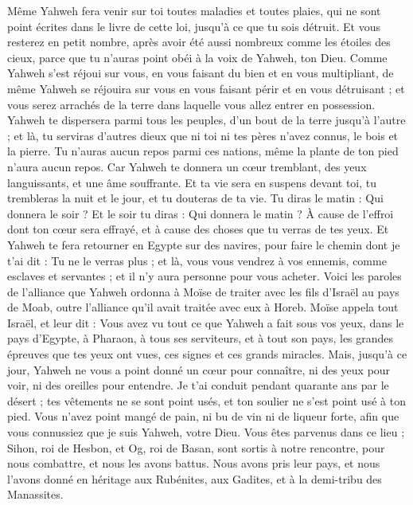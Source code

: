 \begin{multicols}{2}
Même Yahweh fera venir sur toi toutes maladies et toutes plaies, qui ne sont point écrites dans le livre de cette loi, jusqu'à ce que tu sois détruit.
Et vous resterez en petit nombre, après avoir été aussi nombreux comme les étoiles des cieux, parce que tu n'auras point obéi à la voix de Yahweh, ton Dieu.
Comme Yahweh s'est réjoui sur vous, en vous faisant du bien et en vous multipliant, de même Yahweh se réjouira sur vous en vous faisant périr et en vous détruisant ; et vous serez arrachés de la terre dans laquelle vous allez entrer en possession.
Yahweh te dispersera parmi tous les peuples, d’un bout de la terre jusqu'à l'autre ; et là, tu serviras d'autres dieux que ni toi ni tes pères n'avez connus, le bois et la pierre.
Tu n'auras aucun repos parmi ces nations, même la plante de ton pied n'aura aucun repos. Car Yahweh te donnera un cœur tremblant, des yeux languissants, et une âme souffrante.
Et ta vie sera en suspens devant toi, tu trembleras la nuit et le jour, et tu douteras de ta vie.
Tu diras le matin : Qui donnera le soir ? Et le soir tu diras : Qui donnera le matin ? À cause de l'effroi dont ton cœur sera effrayé, et à cause des choses que tu verras de tes yeux.
Et Yahweh te fera retourner en Egypte sur des navires, pour faire le chemin dont je t'ai dit : Tu ne le verras plus ; et là, vous vous vendrez à vos ennemis, comme esclaves et servantes ; et il n'y aura personne pour vous acheter.
\VerseOne{}Voici les paroles de l'alliance que Yahweh ordonna à Moïse de traiter avec les fils d'Israël au pays de Moab, outre l'alliance qu'il avait traitée avec eux à Horeb.
Moïse appela tout Israël, et leur dit : Vous avez vu tout ce que Yahweh a fait sous vos yeux, dans le pays d'Egypte, à Pharaon, à tous ses serviteurs, et à tout son pays,
les grandes épreuves que tes yeux ont vues, ces signes et ces grands miracles.
Mais, jusqu'à ce jour, Yahweh ne vous a point donné un cœur pour connaître, ni des yeux pour voir, ni des oreilles pour entendre.
Je t’ai conduit pendant quarante ans par le désert ; tes vêtements ne se sont point usés, et ton soulier ne s’est point usé à ton pied.
Vous n'avez point mangé de pain, ni bu de vin ni de liqueur forte, afin que vous connussiez que je suis Yahweh, votre Dieu.
Vous êtes parvenus dans ce lieu ; Sihon, roi de Hesbon, et Og, roi de Basan, sont sortis à notre rencontre, pour nous combattre, et nous les avons battus.
Nous avons pris leur pays, et nous l'avons donné en héritage aux Rubénites, aux Gadites, et à la demi-tribu des Manassites.

\end{multicols}
